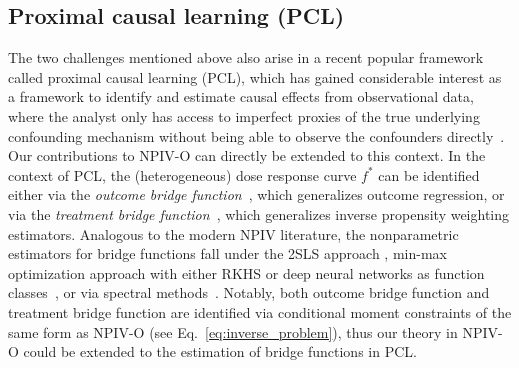 \documentclass[11pt]{article}
\newcommand{\0}{\mathbf{0}}
\begin{document}
\subsection{Proximal causal learning (PCL)}
\label{sec:pcl}
The two challenges mentioned above also arise in a recent popular framework called proximal causal learning (PCL), which has gained considerable interest as a framework to identify and estimate causal effects from observational data, where the analyst only has access to imperfect proxies of the true underlying confounding mechanism without being able to observe the confounders directly~\citep{miao2018identifying, tchetgen2024introduction}. Our contributions to NPIV-O can directly be extended to this context. In the context of PCL, the (heterogeneous) dose response curve $f^{\ast}$ can be identified either via the \emph{outcome bridge function}~\citep{miao2018identifying, deaner2018proxy, mastouri2021proximal, xu2021deep, kallus2021causal, singh2023kernel}, which generalizes outcome regression, or via the \emph{treatment bridge function}~\citep{cui2024semiparametric, kallus2021causal, bozkurt2025densityratiobasedproxycausal, bozkurt2025density}, which generalizes inverse propensity weighting estimators. Analogous to the modern NPIV literature, the nonparametric estimators for bridge functions fall under the 2SLS approach \citep{deaner2018proxy, mastouri2021proximal, singh2023kernel, bozkurt2025densityratiobasedproxycausal, bozkurt2025density}, min-max optimization approach with either RKHS or deep neural networks as function classes~\citep{mastouri2021proximal, ghassami2022minimax, kallus2021causal}, or via spectral methods~\citep{sun2025spectral}. Notably, both outcome bridge function and treatment bridge function are identified via conditional moment constraints of the same form as NPIV-O (see Eq.~\eqref{eq:inverse_problem}), thus our theory in NPIV-O could be extended to 
the estimation of bridge functions in PCL. 
\end{document}
